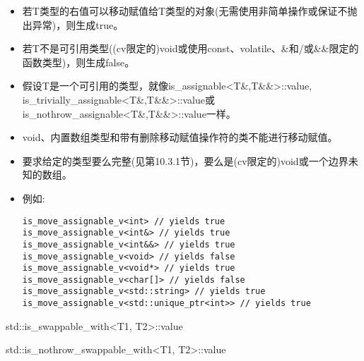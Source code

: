 \begin{itemize}
\item
若T类型的右值可以移动赋值给T类型的对象(无需使用非简单操作或保证不抛出异常)，则生成true。

\item
若T不是可引用类型((cv限定的)void或使用const、volatile、\&和/或\&\&限定的函数类型)，则生成false。

\item
假设T是一个可引用的类型，就像is\_assignable<T\&,T\&\&>::value, is\_trivially\_assignable<T\&,T\&\&>::value或is\_nothrow\_assignable<T\&,T\&\&>::value一样。

\item
void、内置数组类型和带有删除移动赋值操作符的类不能进行移动赋值。

\item
要求给定的类型要么完整(见第10.3.1节)，要么是(cv限定的)void或一个边界未知的数组。

\item
例如:
\begin{lstlisting}[style=styleCXX]
is_move_assignable_v<int> // yields true
is_move_assignable_v<int&> // yields true
is_move_assignable_v<int&&> // yields true
is_move_assignable_v<void> // yields false
is_move_assignable_v<void*> // yields true
is_move_assignable_v<char[]> // yields false
is_move_assignable_v<std::string> // yields true
is_move_assignable_v<std::unique_ptr<int>> // yields true
\end{lstlisting}
\end{itemize}


std::is\_swappable\_with<T1, T2>::value

std::is\_nothrow\_swappable\_with<T1, T2>::value


